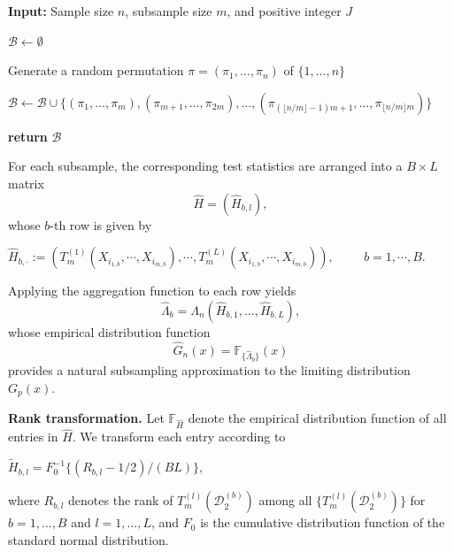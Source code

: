 \documentclass[12pt,reqno,oneside]{amsbook}
\theoremstyle{definition}
\theoremstyle{remark}
\begin{document}
\begin{algorithm}[htbp]
\caption{Construction of subsample index tuples}
\label{alg:subsampling}

\begin{algorithmic}[1]

\State \textbf{Input:} Sample size $n$, subsample size $m$,
and positive integer $J$

\State $\mathcal{B}\gets\emptyset$


    \State Generate a random permutation
    $\pi=(\pi_1,\ldots,\pi_n)$
    of $\{1,\ldots,n\}$

    \State $\mathcal{B}\gets \mathcal{B}\cup
    \{(\pi_1,\ldots,\pi_m),
    (\pi_{m+1},\ldots,\pi_{2m}),
    \ldots,
    (\pi_{(\lfloor n/m\rfloor-1)m+1},
    \ldots,
    \pi_{\lfloor n/m\rfloor m})\}$

\EndFor

\State \textbf{return} $\mathcal{B}$

\end{algorithmic}
\end{algorithm}

For each subsample, the corresponding test statistics are arranged into a $B\times L$ matrix
\[
\widehat{H}=(\widehat{H}_{b,l}),
\]
whose $b$-th row is given by
\begin{center}
$\widehat{H}_{b,\cdot}:=(T_m^{(1)}(X_{{i}_{1,b}},\cdots,X_{{i}_{m,b}}), \cdots, T_m^{(L)}(X_{{i}_{1,b}},\cdots,X_{{i}_{m,b}})),  \hspace{1cm} b=1,\cdots,B.$
\end{center}

Applying the aggregation function to each row yields
\[
\widehat{\Lambda}_{b}
=
\Lambda_n(\widehat{H}_{b,1},\ldots,\widehat{H}_{b,L}),
\]
whose empirical distribution function
\[
\widehat{G}_n(x)
=
\mathbb{F}_{\{\widehat{\Lambda}_b\}}(x)
\]
provides a natural subsampling approximation to the limiting distribution $G_p(x)$.

\hspace{0.5cm}
\textbf{Rank transformation.}
Let $\mathbb{F}_{\widehat{H}}$ denote the empirical distribution function of all entries in $\widehat{H}$. We transform each entry according to
\begin{center}
    $\tilde{H}_{b,l}
    = F_0^{-1}\{(R_{b,l}-1/2 )/(BL)\},$
\end{center}
where $R_{b,l}$ denotes the rank of
$T_m^{(l)}(\mathcal{D}_2^{(b)})$
among all
$\{T_m^{(l)}(\mathcal{D}_2^{(b)})\}$
for
$b=1,\ldots,B$
and
$l=1,\ldots,L$,
and $F_0$ is the cumulative distribution function of the standard normal distribution.
\end{document}
